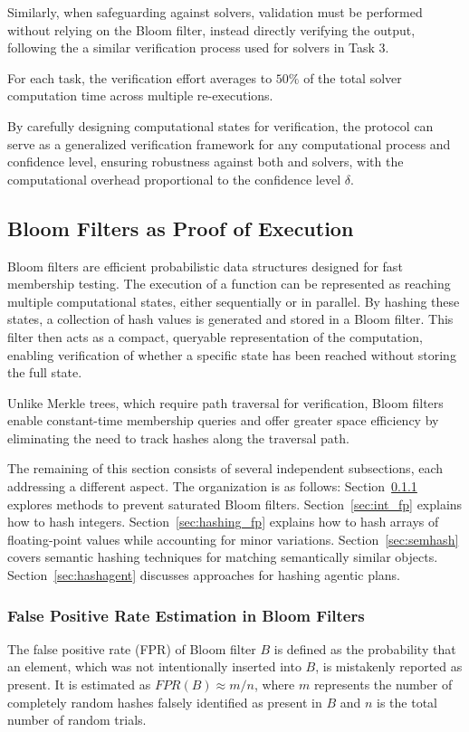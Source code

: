 \documentclass[sigconf, nonacm]{acmart}
\begin{document}
Similarly, when safeguarding against  solvers, validation must be performed without relying on the Bloom filter, instead directly verifying the output, following the a similar verification process used for  solvers in Task 3.

For each task, the verification effort averages to $50\%$ of the total solver computation time across multiple re-executions.

By carefully designing computational states for verification, the  protocol can serve as a generalized verification framework for any computational process and confidence level, ensuring robustness against both  and  solvers, with the computational overhead proportional to the confidence level $\delta$.

\subsection{Bloom Filters as Proof of Execution}

\label{sec:bloom}
Bloom filters are efficient probabilistic data structures designed for fast membership testing. The execution of a function can be represented as reaching multiple computational states, either sequentially or in parallel. By hashing these states, a collection of hash values is generated and stored in a Bloom filter. This filter then acts as a compact, queryable representation of the computation, enabling verification of whether a specific state has been reached without storing the full state.

Unlike Merkle trees, which require path traversal for verification, Bloom filters enable constant-time membership queries and offer greater space efficiency by eliminating the need to track hashes along the traversal path.

The remaining of this section consists of several independent subsections, each addressing a different aspect. The organization is as follows:
Section~\ref{sec:fpr} explores methods to prevent saturated Bloom filters.
Section~\ref{sec:int_fp} explains how to hash integers.
Section~\ref{sec:hashing_fp} explains how to hash arrays of floating-point values while accounting for minor variations.
Section~\ref{sec:semhash} covers semantic hashing techniques for matching semantically similar objects.
Section~\ref{sec:hashagent} discusses approaches for hashing agentic plans.

\subsubsection{False Positive Rate Estimation in Bloom Filters}
\label{sec:fpr}
The false positive rate (FPR) of Bloom filter $B$ is defined as the probability that an element, which was not intentionally inserted into $B$, is mistakenly reported as present. It is estimated
as $\textit{FPR}(B) \approx m / n$, where $m$ represents the number of completely random hashes falsely identified as present in $B$ and $n$ is the total number of random trials.
\end{document}
